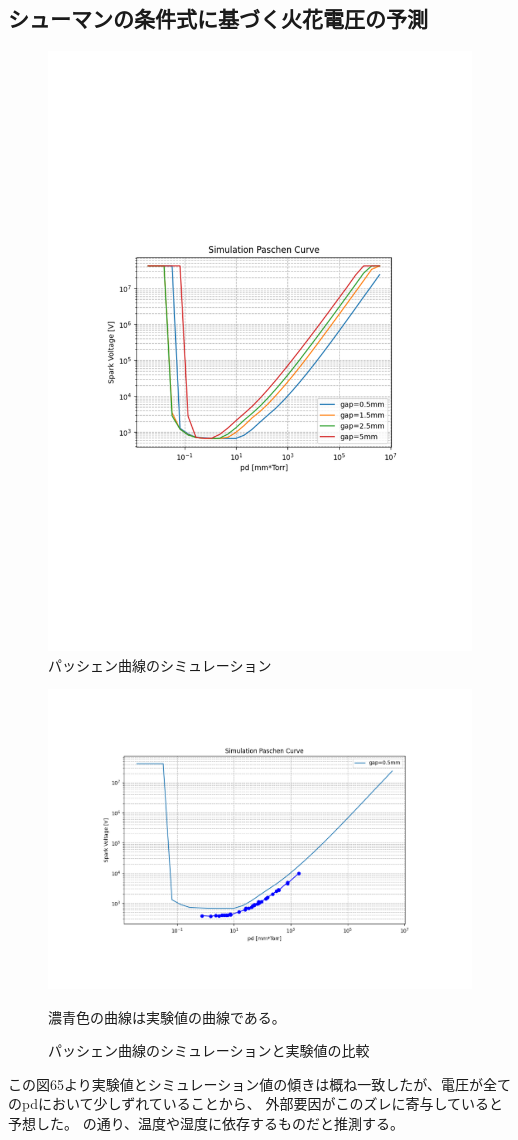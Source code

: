 \documentclass[a4j,twocolumn]{jsarticle}
\begin{document}
\subsection*{シューマンの条件式に基づく火花電圧の予測}


\begin{figure}[htb]
    \centering
    \includegraphics[keepaspectratio,width=0.6\columnwidth]{fig/paschen_curve.pdf}
    \caption{パッシェン曲線のシミュレーション}
\end{figure}


\begin{figure}[htb]
    \centering
    \includegraphics[keepaspectratio,width=0.6\columnwidth]{fig/paschen_curve1.pdf}
    \caption{パッシェン曲線のシミュレーションと実験値の比較}
    濃青色の曲線は実験値の曲線である。
\end{figure}

この図65より実験値とシミュレーション値の傾きは概ね一致したが、電圧が全てのpdにおいて少しずれていることから、
外部要因がこのズレに寄与していると予想した。
\cite{thesis}の通り、温度や湿度に依存するものだと推測する。
















\end{document}
